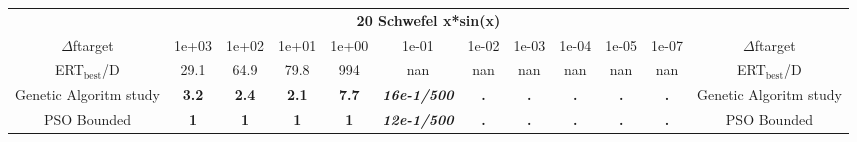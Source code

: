 \begin{tabular}{cccccccccccc}
 & \multicolumn{10}{c}{{\normalsize \textbf{20 Schwefel x*sin(x)}}}\\
$\Delta$ftarget& 1e+03& 1e+02& 1e+01& 1e+00& 1e-01& 1e-02& 1e-03& 1e-04& 1e-05& 1e-07 & $\Delta$ftarget \\
ERT$_{\textrm{best}}$/D& 29.1& 64.9& 79.8& 994& nan& nan& nan& nan& nan& nan & ERT$_{\textrm{best}}$/D \\
\hline
Genetic Algoritm study & \textbf{3.2} & \textbf{2.4} & \textbf{2.1} & \textbf{7.7} & \textbf{\textit{16e-1}\textit{/500}} & \textbf{.} & \textbf{.} & \textbf{.} & \textbf{.} & \textbf{.} & Genetic Algoritm study \cite{add_an_entry_for_Genetic Algoritm study_in_bbob.bib}\\
PSO Bounded & \textbf{1} & \textbf{1} & \textbf{1} & \textbf{1} & \textbf{\textit{12e-1}\textit{/500}} & \textbf{.} & \textbf{.} & \textbf{.} & \textbf{.} & \textbf{.} & PSO Bounded \cite{add_an_entry_for_PSO Bounded_in_bbob.bib}
\end{tabular}
